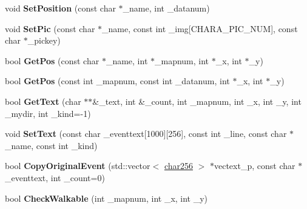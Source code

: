 \begin{DoxyCompactItemize}
\item 
void {\bfseries Set\+Position} (const char $\ast$\+\_\+name, int \+\_\+datanum)\hypertarget{class_c_eve_manager_a0c404d20b62870073c652eb068f0ea76}{}\label{class_c_eve_manager_a0c404d20b62870073c652eb068f0ea76}

\item 
void {\bfseries Set\+Pic} (const char $\ast$\+\_\+name, const int \+\_\+img\mbox{[}C\+H\+A\+R\+A\+\_\+\+P\+I\+C\+\_\+\+N\+UM\mbox{]}, const char $\ast$\+\_\+pickey)\hypertarget{class_c_eve_manager_ab06d15c3d24c0f375f2f0fbf7c93a09a}{}\label{class_c_eve_manager_ab06d15c3d24c0f375f2f0fbf7c93a09a}

\item 
bool {\bfseries Get\+Pos} (const char $\ast$\+\_\+name, int $\ast$\+\_\+mapnum, int $\ast$\+\_\+x, int $\ast$\+\_\+y)\hypertarget{class_c_eve_manager_aaab5f2af51e52e321820aaa5899b3f42}{}\label{class_c_eve_manager_aaab5f2af51e52e321820aaa5899b3f42}

\item 
bool {\bfseries Get\+Pos} (const int \+\_\+mapnum, const int \+\_\+datanum, int $\ast$\+\_\+x, int $\ast$\+\_\+y)\hypertarget{class_c_eve_manager_a3d261065c2a87a8f30c358e307a55343}{}\label{class_c_eve_manager_a3d261065c2a87a8f30c358e307a55343}

\item 
bool {\bfseries Get\+Text} (char $\ast$$\ast$\&\+\_\+text, int \&\+\_\+count, int \+\_\+mapnum, int \+\_\+x, int \+\_\+y, int \+\_\+mydir, int \+\_\+kind=-\/1)\hypertarget{class_c_eve_manager_a2c4dbfe9aad0101b96b5fb0e8bc80ee7}{}\label{class_c_eve_manager_a2c4dbfe9aad0101b96b5fb0e8bc80ee7}

\item 
void {\bfseries Set\+Text} (const char \+\_\+eventtext\mbox{[}1000\mbox{]}\mbox{[}256\mbox{]}, const int \+\_\+line, const char $\ast$\+\_\+name, const int \+\_\+kind)\hypertarget{class_c_eve_manager_ae0fad035cbcdb2e78aa519f3f26e1e98}{}\label{class_c_eve_manager_ae0fad035cbcdb2e78aa519f3f26e1e98}

\item 
bool {\bfseries Copy\+Original\+Event} (std\+::vector$<$ \hyperlink{structchar256}{char256} $>$ $\ast$vectext\+\_\+p, const char $\ast$\+\_\+eventtext, int \+\_\+count=0)\hypertarget{class_c_eve_manager_ada2ae4db5f86e66f5dda8e5077d59754}{}\label{class_c_eve_manager_ada2ae4db5f86e66f5dda8e5077d59754}

\item 
bool {\bfseries Check\+Walkable} (int \+\_\+mapnum, int \+\_\+x, int \+\_\+y)\hypertarget{class_c_eve_manager_aabd1190c4380d0c76cfe6669de019c28}{}\label{class_c_eve_manager_aabd1190c4380d0c76cfe6669de019c28}


\end{DoxyCompactItemize}
